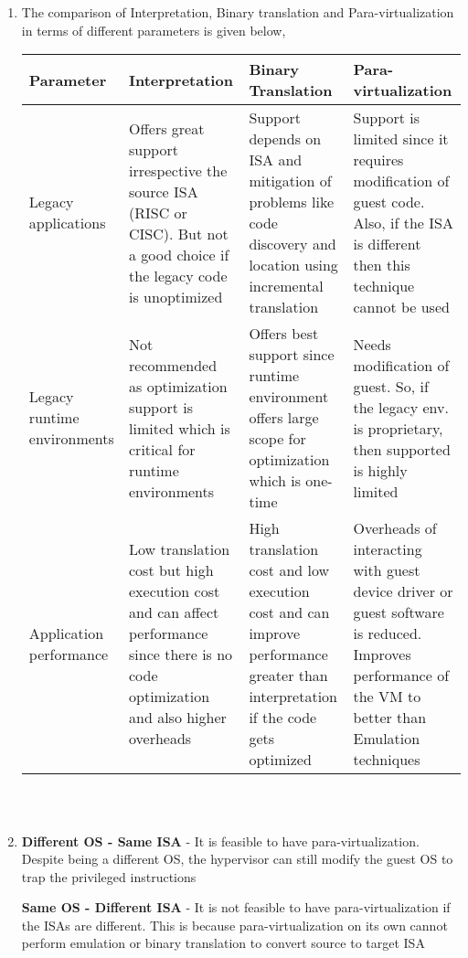 \documentclass[11pt,a4paper,oneside]{article}
\begin{document}
\begin{enumerate}
		\item The comparison of Interpretation, Binary translation and Para-virtualization in terms of different parameters is given below,
		
		\begin{center}
			\begin{tabular}{|p{2cm}|p{4cm}|p{4cm}|p{4cm}|}
				\hline 
				\textbf{Parameter}  & \textbf{Interpretation} & \textbf{Binary Translation} & \textbf{Para-virtualization} \\
				\hline
				Legacy applications & Offers great support irrespective the source ISA (RISC or CISC). But not a good choice if the legacy code is unoptimized & Support depends on ISA and mitigation of problems like code discovery and location using incremental translation   & Support is limited since it requires modification of guest code. Also, if the ISA is different then this technique cannot be used\\
				\hline
				Legacy runtime environments & Not recommended as optimization support is limited which is critical for runtime environments & Offers best support since runtime environment offers large scope for optimization which is one-time & Needs modification of guest. So, if the legacy env. is proprietary, then supported is highly limited\\
				\hline
				Application performance & Low translation cost but high execution cost and can affect performance since there is no code optimization and also higher overheads & High translation cost and low execution cost and can improve performance greater than interpretation if the code gets optimized & Overheads of interacting with guest device driver or guest software is reduced. Improves performance of the VM to better than Emulation techniques\\
				\hline
			\end{tabular}
		\end{center}
	
	    \begin{Verbatim}
	    
	    
	    \end{Verbatim} 
		
		\item \textbf{Different OS - Same ISA} - It is feasible to have para-virtualization. Despite being a different OS, the hypervisor can still modify the guest OS to trap the privileged instructions
		
		\textbf{Same OS - Different ISA} - It is not feasible to have para-virtualization if the ISAs are different. This is because para-virtualization on its own cannot perform emulation or binary translation to convert source to target ISA
		

\end{enumerate}
\end{document}
